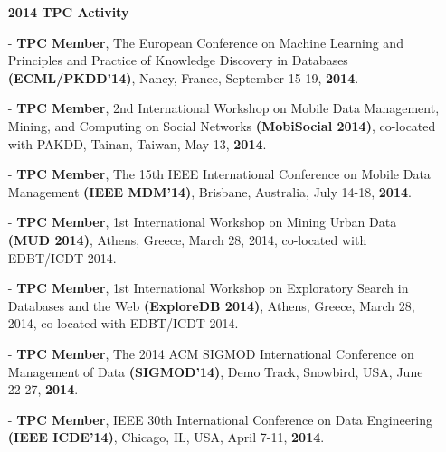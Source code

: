 \documentclass[10pt]{article}
\begin{document}
\begin{itemize}
\begin{itemize}
%
\vspace{0.1in}
\item[]{\bf 2014 TPC Activity\hrulefill }
%
\item[-] {\bf TPC Member}, The European Conference on Machine Learning and Principles and Practice of Knowledge Discovery in Databases {\bf (ECML/PKDD'14)}, Nancy, France, September 15-19, {\bf 2014}.
\item[-] {\bf TPC Member}, 2nd International Workshop on Mobile Data Management, Mining, and Computing on Social Networks {\bf (MobiSocial 2014)}, co-located with PAKDD, Tainan, Taiwan, May 13, {\bf 2014}.
\item[-] {\bf TPC Member}, The 15th IEEE International Conference on Mobile Data Management {\bf (IEEE MDM'14)}, Brisbane, Australia, July 14-18, {\bf 2014}.
\item[-] {\bf TPC Member},
1st International Workshop on Mining Urban Data {\bf (MUD 2014)}, Athens, Greece, March 28, 2014, co-located with EDBT/ICDT 2014.
\item[-] {\bf TPC Member},
1st International Workshop on Exploratory Search in Databases and the Web {\bf (ExploreDB 2014)}, Athens, Greece, March 28, 2014, co-located with EDBT/ICDT 2014.
\item[-] {\bf TPC Member}, The 2014 ACM SIGMOD International Conference on Management of Data {\bf (SIGMOD'14)}, Demo Track, Snowbird, USA, June 22-27, {\bf 2014}.
\item[-] {\bf TPC Member}, IEEE 30th International Conference on Data Engineering {\bf (IEEE ICDE'14)}, Chicago, IL, USA, April 7-11, {\bf 2014}.


\end{itemize}
\end{itemize}
\end{document}
